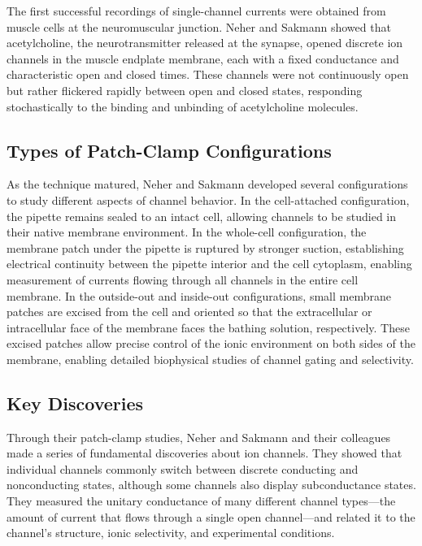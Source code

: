 The first successful recordings of single-channel currents were obtained from muscle cells at the neuromuscular junction. Neher and Sakmann showed that acetylcholine, the neurotransmitter released at the synapse, opened discrete ion channels in the muscle endplate membrane, each with a fixed conductance and characteristic open and closed times. These channels were not continuously open but rather flickered rapidly between open and closed states, responding stochastically to the binding and unbinding of acetylcholine molecules.

\subsection{Types of Patch-Clamp Configurations}

As the technique matured, Neher and Sakmann developed several configurations to study different aspects of channel behavior. In the cell-attached configuration, the pipette remains sealed to an intact cell, allowing channels to be studied in their native membrane environment. In the whole-cell configuration, the membrane patch under the pipette is ruptured by stronger suction, establishing electrical continuity between the pipette interior and the cell cytoplasm, enabling measurement of currents flowing through all channels in the entire cell membrane. In the outside-out and inside-out configurations, small membrane patches are excised from the cell and oriented so that the extracellular or intracellular face of the membrane faces the bathing solution, respectively. These excised patches allow precise control of the ionic environment on both sides of the membrane, enabling detailed biophysical studies of channel gating and selectivity.

\subsection{Key Discoveries}

Through their patch-clamp studies, Neher and Sakmann and their colleagues made a series of fundamental discoveries about ion channels. They showed that individual channels commonly switch between discrete conducting and nonconducting states, although some channels also display subconductance states. They measured the unitary conductance of many different channel types---the amount of current that flows through a single open channel---and related it to the channel's structure, ionic selectivity, and experimental conditions.

